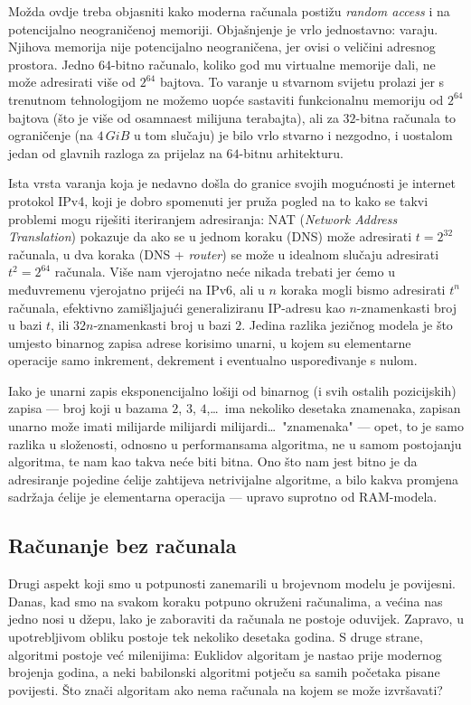 Možda ovdje treba objasniti kako moderna računala postižu \emph{random access} i na potencijalno neograničenoj memoriji. Objašnjenje je vrlo jednostavno: varaju. Njihova memorija nije potencijalno neograničena, jer ovisi o veličini adresnog prostora. Jedno $64$-bitno računalo, koliko god mu virtualne memorije dali, ne može adresirati više od $2^{64}$ bajtova. To varanje u stvarnom svijetu prolazi jer s trenutnom tehnologijom ne možemo uopće sastaviti funkcionalnu memoriju od $2^{64}$ bajtova (što je više od osamnaest milijuna terabajta), ali za $32$-bitna računala to ograničenje (na $4\,GiB$ u tom slučaju) je bilo vrlo stvarno i nezgodno, i uostalom jedan od glavnih razloga za prijelaz na $64$-bitnu arhitekturu.

Ista vrsta varanja koja je nedavno došla do granice svojih mogućnosti je internet protokol IPv4, koji je dobro spomenuti jer pruža pogled na to kako se takvi problemi mogu riješiti iteriranjem adresiranja: NAT (\emph{Network Address Translation}) pokazuje da ako se u jednom koraku (DNS) može adresirati $t=2^{32}$ računala, u dva koraka (DNS + \emph{router}) se može u idealnom slučaju adresirati $t^2=2^{64}$ računala. Više nam vjerojatno neće nikada trebati jer ćemo u međuvremenu vjerojatno prijeći na IPv6, ali u $n$ koraka mogli bismo adresirati $t^n$ računala, efektivno zamišljajući generaliziranu IP-adresu kao $n$-znamenkasti broj u bazi $t$, ili $32n$-znamenkasti broj u bazi $2$. Jedina razlika jezičnog modela je što umjesto binarnog zapisa adrese korisimo unarni, u kojem su elementarne operacije samo inkrement, dekrement i eventualno uspoređivanje s nulom.

Iako je unarni zapis eksponencijalno lošiji od binarnog (i svih ostalih pozicijskih) zapisa --- broj koji u bazama $2$, $3$, $4$,\ldots\ ima nekoliko desetaka znamenaka, zapisan unarno može imati milijarde milijardi milijardi\ldots\ "znamenaka" --- opet, to je samo razlika u složenosti, odnosno u performansama algoritma, ne u samom postojanju algoritma, te nam kao takva neće biti bitna. Ono što nam jest bitno je da adresiranje pojedine ćelije zahtijeva netrivijalne algoritme, a bilo kakva promjena sadržaja ćelije je elementarna operacija --- upravo suprotno od RAM-modela.

\subsection{Računanje bez računala}

Drugi aspekt koji smo u potpunosti zanemarili u brojevnom modelu je povijesni. Danas, kad smo na svakom koraku potpuno okruženi računalima, a većina nas jedno nosi u džepu, lako je zaboraviti da računala ne postoje oduvijek. Zapravo, u upotrebljivom obliku postoje tek nekoliko desetaka godina. S druge strane, algoritmi postoje već milenijima: Euklidov algoritam je nastao prije modernog brojenja godina, a neki babilonski algoritmi potječu sa samih početaka pisane povijesti. Što znači algoritam ako nema računala na kojem se može izvršavati?

